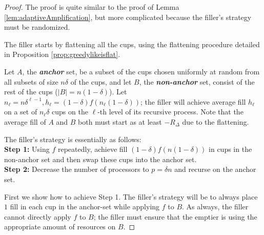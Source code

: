 \documentclass[twocolumn]{article}[10pt]
\newcommand{\defn}[1]{{\textit{\textbf{\boldmath #1}}}\xspace}
\begin{document}
\begin{proof}
  The proof is quite similar to the proof of Lemma
  \ref{lem:adaptiveAmplification}, but more complicated because the filler's
  strategy must be randomized.

  The filler starts by flattening all the cups, using the flattening procedure
  detailed in Proposition \ref{prop:greedylikeisflat}. 

  Let $A$, the \defn{anchor} set, be a subset of the cups chosen uniformly at
  random from all subsets of size $n\delta$ of the cups, and let $B$, the
  \defn{non-anchor} set, consist of the rest of the cups ($|B| = n(1-\delta)$).
  Let $n_\ell = n\delta^{\ell-1}, h_\ell = (1-\delta)f(n_\ell(1-\delta))$; the
  filler will achieve average fill $h_\ell$ on a set of $n_\ell\delta$ cups on
  the $\ell$-th level of its recursive process. Note that the average fill of
  $A$ and $B$ both must start as at least $-R_\Delta$ due to the flattening.

  The filler's strategy is essentially as follows:\\
  \textbf{Step 1:} Using $f$ repeatedly, achieve fill
  $(1-\delta)f(n(1-\delta))$ in cups in the non-anchor set and then swap these
  cups into the anchor set.  \\
  \textbf{Step 2:} Decrease the number of processors to $p=\delta n$ and
  recurse on the anchor set.

  First we show how to achieve Step 1. 
  The filler's strategy will be to always place $1$ fill in each cup in the
  anchor-set while applying $f$ to $B$.
  As always, the filler cannot directly apply $f$ to $B$; the filler must ensure that
  the emptier is using the appropriate amount of resources on $B$.


\end{proof}
\end{document}
